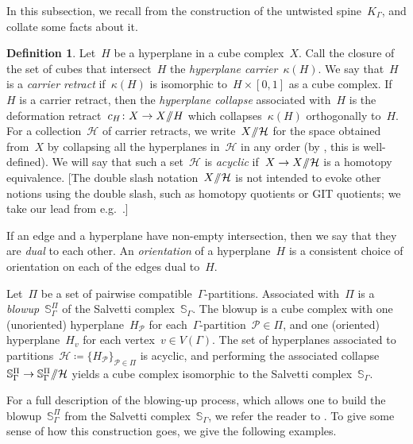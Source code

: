 \documentclass[11pt]{amsart}
\theoremstyle{definition}
\theoremstyle{definition}
\theoremstyle{definition}
\theoremstyle{definition}
\newtheorem{definition}[theorem]{Definition}
\newcommand{\calP}{\mathcal{P}} %
\newcommand{\sal}{\mathbb{S}_{\Gamma}} %
\newcommand{\salb}[1]{\mathbb{S}_\Gamma^{#1}} %
\newcommand{\spine}{K_{\Gamma}} %
\newcommand{\ssslash}{\smash{\sslash}} %
\begin{document}
In this subsection, we recall from \cite{CharneyStambaughVogtmannUntwistedOuterSpace17} the construction of the untwisted spine~$\spine$, and collate some facts about it.

\begin{definition}\label{def:hyperplane collapse}
Let~$H$ be a hyperplane in a cube complex~$X$. Call the closure of the set of cubes that intersect~$H$ the \emph{hyperplane carrier}~$\kappa(H)$. We say that~$H$ is a \emph{carrier retract} if~$\kappa(H)$ is isomorphic to~$H \times [0, 1]$ as a cube complex. If~$H$ is a carrier retract, then the \emph{hyperplane collapse} associated with~$H$ is the deformation retract~$c_H\colon X \to X\ssslash H$ which collapses~$\kappa(H)$ orthogonally to~$H$. For a collection~$\mathcal{H}$ of carrier retracts, we write~$X\ssslash \mathcal{H}$ for the space obtained from~$X$ by collapsing all the hyperplanes in~$\mathcal{H}$ in any order (by \cite[Lemma 4.4]{CharneyStambaughVogtmannUntwistedOuterSpace17}, this is well-defined). We will say that such a set~$\mathcal{H}$ is \emph{acyclic} if~$X \to X\ssslash \mathcal{H}$ is a homotopy equivalence. [The double slash notation~$X\ssslash \mathcal{H}$ is not intended to evoke other notions using the double slash, such as homotopy quotients or GIT quotients; we take our lead from e.g.~\cite{BregmanCharneyVogtmannFiniteSubgroups25}.]

    \noindent If an edge and a hyperplane have non-empty intersection, then we say that they are \emph{dual} to each other. An \emph{orientation} of a hyperplane~$H$ is a consistent choice of orientation on each of the edges dual to~$H$.
\end{definition}

Let~$\Pi$ be a set of pairwise compatible~$\Gamma$-partitions. Associated with~$\Pi$ is a \emph{blowup}~$\salb{\Pi}$ of the Salvetti complex~$\sal$. The blowup is a cube complex with one (unoriented) hyperplane~$H_\calP$ for each~$\Gamma$-partition~$\calP \in \Pi$, and one (oriented) hyperplane~$H_v$ for each vertex~$v \in V(\Gamma)$. The set of hyperplanes associated to partitions~$\mathcal{H} \coloneqq \{H_\calP\}_{\calP \in \Pi}$ is acyclic, and performing the associated collapse~$\salb{\Pi} \to \salb{\Pi} \ssslash \mathcal{H}$ yields a cube complex isomorphic to the Salvetti complex~$\sal$.

For a full description of the blowing-up process, which allows one to build the blowup~$\salb{\Pi}$ from the Salvetti complex~$\sal$, we refer the reader to \cite{CharneyStambaughVogtmannUntwistedOuterSpace17}. To give some sense of how this construction goes, we give the following examples.
\end{document}
